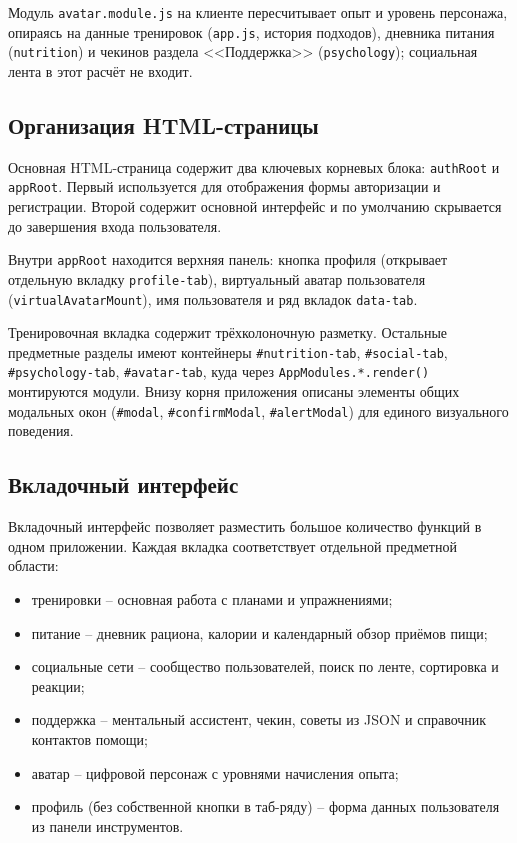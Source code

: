 Модуль \texttt{avatar.module.js} на клиенте пересчитывает опыт и уровень персонажа, опираясь на данные тренировок (\texttt{app.js}, история подходов), дневника питания (\texttt{nutrition}) и чекинов раздела <<Поддержка>> (\texttt{psychology}); социальная лента в этот расчёт не входит.

\subsection{Организация HTML-страницы}

Основная HTML-страница содержит два ключевых корневых блока: \texttt{authRoot} и \texttt{appRoot}. Первый используется для отображения формы авторизации и регистрации. Второй содержит основной интерфейс и по умолчанию скрывается до завершения входа пользователя.

Внутри \texttt{appRoot} находится верхняя панель: кнопка профиля (открывает отдельную вкладку \texttt{profile-tab}), виртуальный аватар пользователя (\texttt{virtualAvatarMount}), имя пользователя и ряд вкладок \texttt{data-tab}.

Тренировочная вкладка содержит трёхколоночную разметку. Остальные предметные разделы имеют контейнеры \texttt{\#nutrition-tab}, \texttt{\#social-tab}, \texttt{\#psychology-tab}, \texttt{\#avatar-tab}, куда через \texttt{AppModules.*.render()} монтируются модули. Внизу корня приложения описаны элементы общих модальных окон (\texttt{\#modal}, \texttt{\#confirmModal}, \texttt{\#alertModal}) для единого визуального поведения.

\subsection{Вкладочный интерфейс}

Вкладочный интерфейс позволяет разместить большое количество функций в одном приложении. Каждая вкладка соответствует отдельной предметной области:
\begin{itemize}
	\item тренировки -- основная работа с планами и упражнениями;
	\item питание -- дневник рациона, калории и календарный обзор приёмов пищи;
	\item социальные сети -- сообщество пользователей, поиск по ленте, сортировка и реакции;
	\item поддержка -- ментальный ассистент, чекин, советы из JSON и справочник контактов помощи;
	\item аватар -- цифровой персонаж с уровнями начисления опыта;
	\item профиль (без собственной кнопки в таб-ряду) -- форма данных пользователя из панели инструментов.
\end{itemize}

